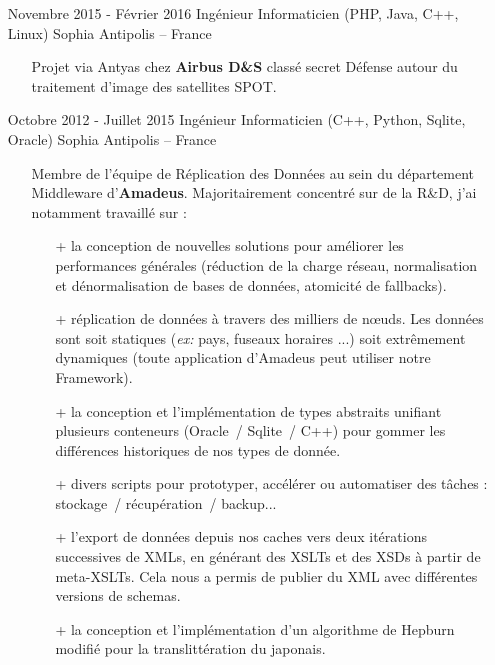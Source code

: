 \documentclass{res}
\begin{document}
\begin{resume}
\begin{itemize}
\begin{itemize}
\begin{itemize}
				\item[+] C\^ot\'e Front-End : HTML, Bootstrap \& uikit, Angular 1.5.
			\end{itemize}
		\end{itemize}
		\item[] Novembre 2015 - F\'evrier 2016 \tabto{5cm} Ing\'enieur Informaticien (PHP, Java, C++, Linux) \hfill Sophia Antipolis -- France
		\begin{itemize}
			\item[] Projet via Antyas chez \textbf{Airbus D\&S} class\'e secret D\'efense autour du traitement d'image des satellites SPOT.
		\end{itemize}
		\item[] Octobre 2012 - Juillet 2015 \tabto{5cm} Ing\'enieur Informaticien (C++, Python, Sqlite, Oracle)  \hfill Sophia Antipolis -- France
		\begin{itemize}
			\item[] Membre de l'\'equipe de R\'eplication des Donn\'ees au sein du d\'epartement Middleware d'\textbf{Amadeus}. Majoritairement concentr\'e sur de la R\&D, j'ai notamment travaill\'e sur :
			\begin{itemize}
				\item[+] la conception de nouvelles solutions pour am\'eliorer les performances g\'en\'erales (r\'eduction de la charge r\'eseau, normalisation et d\'enormalisation de bases de donn\'ees, atomicit\'e de fallbacks).
				\item[+] r\'eplication de donn\'ees \`a travers des milliers de n\oe{}uds. Les donn\'ees sont soit statiques (\textit{ex:} pays, fuseaux horaires ...) soit extr\^emement dynamiques (toute application d'Amadeus peut utiliser notre Framework).
				\item[+] la conception et l'impl\'ementation de types abstraits unifiant plusieurs conteneurs (Oracle~/ Sqlite~/ C++) pour gommer les diff\'erences historiques de nos types de donn\'ee.
				\item[+] divers scripts pour prototyper, acc\'el\'erer ou automatiser des t\^aches : stockage~/ r\'ecup\'eration~/ backup...
				\item[+] l'export de donn\'ees depuis nos caches vers deux it\'erations successives de XMLs, en g\'en\'erant des XSLTs et des XSDs \`a partir de meta-XSLTs. Cela nous a permis de publier du XML avec diff\'erentes versions de schemas.
				\item[+] la conception et l'impl\'ementation d'un algorithme de Hepburn modifi\'e pour la translitt\'eration du japonais.

\end{itemize}
\end{itemize}
\end{itemize}
\end{resume}
\end{document}
